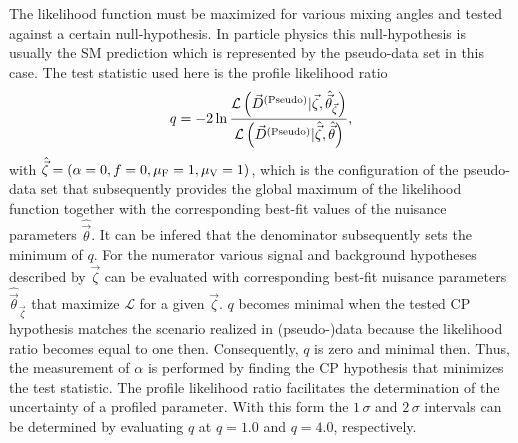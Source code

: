 The likelihood function must be maximized for various mixing angles and tested against a certain null-hypothesis. In particle physics this null-hypothesis is usually the SM prediction which is 
 represented by the pseudo-data set in this case.
The test statistic used here is the profile likelihood ratio 
\begin{equation}
    q = -2 \ln \frac{\mathcal{L}\left( \vec{D}^\text{(Pseudo)} | \vec{\zeta}, \hat{\vec{\theta}}_{\vec{\zeta}} \right)}{\mathcal{L}\left( \vec{D}^\text{(Pseudo)} | \hat{\vec{\zeta}}, \hat{\vec{\theta}} \right)},
\end{equation}
with $\hat{\vec{\zeta}} = \left( \alpha=0,f=0, \mu_\text{F}=1, \mu_\text{V}=1 \right)$, which is the configuration of the pseudo-data set that subsequently provides the global maximum of the likelihood function together with the corresponding best-fit values of the nuisance parameters $\hat{\vec{\theta}}$.
It can be infered that the denominator subsequently sets the minimum of $q$. For the numerator various signal and background hypotheses described by $\vec{\zeta}$ can be evaluated with corresponding best-fit nuisance parameters $\hat{\vec{\theta}}_{\vec{\zeta}}$ that maximize $\mathcal{L}$ for a given $\vec{\zeta}$. $q$ becomes minimal when the tested CP hypothesis matches the scenario realized in (pseudo-)data
because the likelihood ratio becomes equal to one then. Consequently, $q$ is zero and minimal then.
Thus, the measurement of $\alpha$ is performed by finding the CP hypothesis that minimizes the test statistic.
The profile likelihood ratio facilitates the determination of the uncertainty of a profiled parameter. With this form 
the $1\,\sigma$ and $2\,\sigma$ intervals can be determined by evaluating $q$ at $q=1.0$ and $q=4.0$, respectively.

